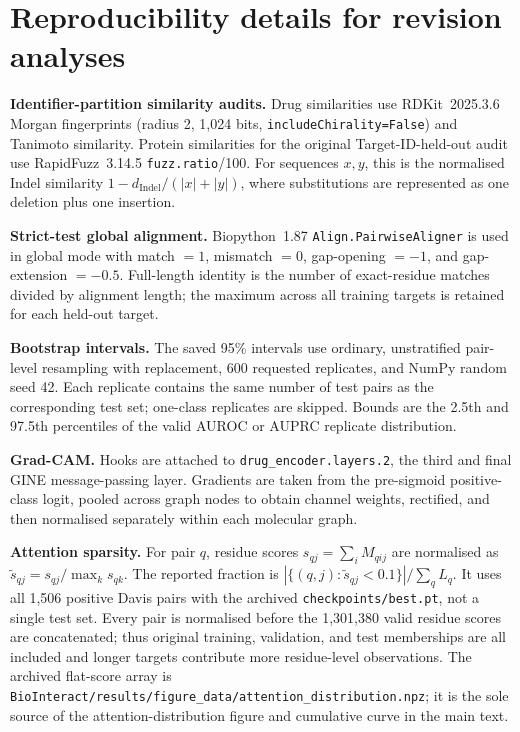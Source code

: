 \documentclass[11pt]{article}
\begin{document}
\section*{Reproducibility details for revision analyses}

\noindent\textbf{Identifier-partition similarity audits.}
Drug similarities use RDKit~2025.3.6 Morgan fingerprints (radius 2, 1,024 bits,
\texttt{includeChirality=False}) and Tanimoto similarity. Protein similarities
for the original Target-ID-held-out audit use RapidFuzz~3.14.5
\texttt{fuzz.ratio}/100. For sequences $x,y$, this is the normalised Indel
similarity $1-d_{\mathrm{Indel}}/(|x|+|y|)$, where substitutions are represented
as one deletion plus one insertion.

\medskip
\noindent\textbf{Strict-test global alignment.}
Biopython~1.87 \texttt{Align.PairwiseAligner} is used in global mode with match
$=1$, mismatch $=0$, gap-opening $=-1$, and gap-extension $=-0.5$. Full-length
identity is the number of exact-residue matches divided by alignment length; the
maximum across all training targets is retained for each held-out target.

\medskip
\noindent\textbf{Bootstrap intervals.}
The saved 95\% intervals use ordinary, unstratified pair-level resampling with
replacement, 600 requested replicates, and NumPy random seed 42. Each replicate
contains the same number of test pairs as the corresponding test set; one-class
replicates are skipped. Bounds are the 2.5th and 97.5th percentiles of the valid
AUROC or AUPRC replicate distribution.

\medskip
\noindent\textbf{Grad-CAM.}
Hooks are attached to \texttt{drug\_encoder.layers.2}, the third and final GINE
message-passing layer. Gradients are taken from the pre-sigmoid positive-class
logit, pooled across graph nodes to obtain channel weights, rectified, and then
normalised separately within each molecular graph.

\medskip
\noindent\textbf{Attention sparsity.}
For pair $q$, residue scores $s_{qj}=\sum_i M_{qij}$ are normalised as
$\widetilde{s}_{qj}=s_{qj}/\max_k s_{qk}$. The reported fraction is
$|\{(q,j):\widetilde{s}_{qj}<0.1\}|/\sum_q L_q$. It uses all 1,506 positive Davis
pairs with the archived \texttt{checkpoints/best.pt}, not a single test set.
Every pair is normalised before the 1,301,380 valid residue scores are
concatenated; thus original training, validation, and test memberships are all
included and longer targets contribute more residue-level observations.
The archived flat-score array is
\texttt{BioInteract/results/figure\_data/attention\_distribution.npz}; it is
the sole source of the attention-distribution figure and cumulative curve in the
main text.
\end{document}
